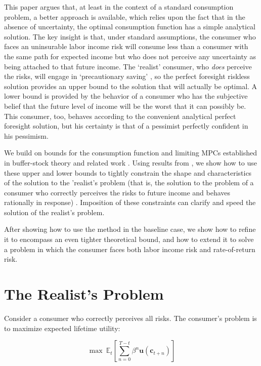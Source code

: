 \documentclass[preprint,authoryear]{elsarticle}
\newcommand{\Ex}{\mathbf{\mathbb{E}}}
\newcommand{\DiscFac}{\beta}
\newcommand{\cLvl}{\mathbf{c}}
\newcommand{\uFunc}{\mathbf{u}}
\begin{document}
This paper argues that, at least in the context of a standard consumption problem,
a better approach is available, which relies upon the fact that in the absence of
uncertainty, the optimal consumption function has a simple analytical solution. The key insight is that, under standard
assumptions, the consumer who faces an uninsurable labor income risk will
consume less than a consumer with the same path for expected income but who does
not perceive any uncertainty as being attached to that future income. The
`realist' consumer, who \textit{does} perceive the risks, will engage in
`precautionary saving' \citep{Leland1968, Sandmo1970, Kimball1990}, so the perfect foresight riskless solution provides an
upper bound to the solution that will actually be optimal. A lower bound is
provided by the behavior of a consumer who has the subjective belief that the
future level of income will be the worst that it can possibly be. This consumer,
too, behaves according to the convenient analytical perfect foresight solution,
but his certainty is that of a pessimist perfectly confident in his pessimism.

We build on bounds for the consumption function and limiting MPCs established in buffer-stock theory and related work \citep{StachurskiToda2019JET, MST2020JET}. Using results from \citet{CarrollShanker2024}, we show how to use these upper
and lower bounds to tightly constrain the shape and characteristics of the
solution to the 'realist's problem (that is, the solution to the problem of a consumer who correctly perceives the risks to future income and behaves rationally in response) \citep{Carroll1997}. Imposition of these constraints can
clarify and speed the solution of the realist's problem.

After showing how to use the method in the baseline case, we show how to refine
it to encompass an even tighter theoretical bound, and how to extend it
to solve a problem in which the consumer faces both labor income risk and rate-of-return risk.

\section{The Realist's Problem}

Consider a consumer who correctly perceives all risks. The consumer's problem is to maximize expected lifetime utility:

\begin{equation}
\label{eq:MaxProb}
\max~\Ex_{t}\left[\sum_{n=0}^{T-t}\DiscFac^{n} \uFunc(\cLvl_{t+n})\right]
\end{equation}
\end{document}
